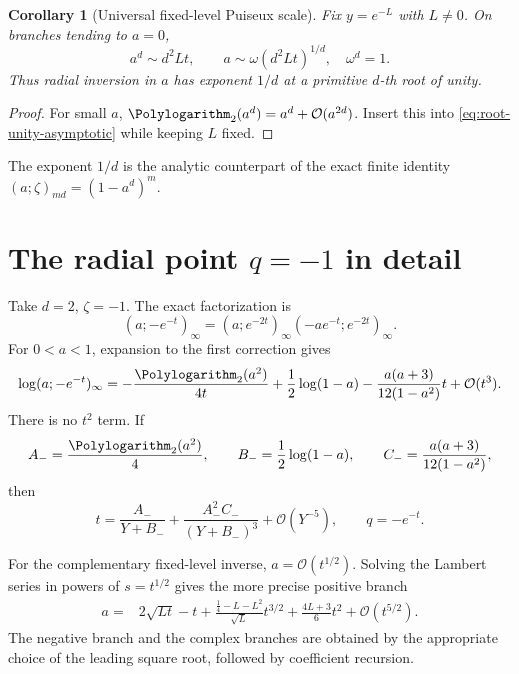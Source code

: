 \documentclass[11pt,oneside]{book}
\newtheorem{corollary}[theorem]{Corollary}
\theoremstyle{definition}
\theoremstyle{remark}
\newcommand{\OO}{\mathcal{O}}
\begin{document}
\begin{corollary}[Universal fixed-level Puiseux scale]\label{cor:a-root-unity-scale}
Fix $y=e^{-L}$ with $L\ne0$.  On branches tending to $a=0$,
\begin{equation}\label{eq:a-root-unity-leading}
 a^d\sim d^2Lt,
 \qquad
 a\sim\omega(d^2Lt)^{1/d},\quad \omega^d=1.
\end{equation}
Thus radial inversion in $a$ has exponent $1/d$ at a primitive $d$-th root of
unity.
\end{corollary}
\begin{proof}
For small $a$, $\Polylogarithm_2(a^d)=a^d+\OO(a^{2d})$.  Insert this into
\eqref{eq:root-unity-asymptotic} while keeping $L$ fixed.
\end{proof}

The exponent $1/d$ is the analytic counterpart of the exact finite identity
$(a;\zeta)_{md}=(1-a^d)^m$.

\section{The radial point $q=-1$ in detail}
Take $d=2$, $\zeta=-1$.  The exact factorization is
\[
 (a;-e^{-t})_\infty
 =(a;e^{-2t})_\infty(-ae^{-t};e^{-2t})_\infty.
\]
For $0<a<1$, expansion to the first correction gives
\begin{equation}\label{eq:minus-one-infinite-fixed-a}
 \log(a;-e^{-t})_\infty
 =-\frac{\Polylogarithm_2(a^2)}{4t}+\frac12\log(1-a)
 -\frac{a(a+3)}{12(1-a^2)}t+\OO(t^3).
\end{equation}
There is no $t^2$ term.  If
\[
 A_-={\Polylogarithm_2(a^2)\over4},\qquad
 B_-={1\over2}\log(1-a),\qquad
 C_-={a(a+3)\over12(1-a^2)},
\]
then
\begin{equation}\label{eq:minus-one-inverse-t}
 t=\frac{A_-}{Y+B_-}
 +\frac{A_-^2C_-}{(Y+B_-)^3}+\OO(Y^{-5}),
 \qquad q=-e^{-t}.
\end{equation}

For the complementary fixed-level inverse, $a=\OO(t^{1/2})$.  Solving the
Lambert series in powers of $s=t^{1/2}$ gives the more precise positive branch
\begin{align}
 a={}&2\sqrt{Lt}-t
 +\frac{\tfrac14-L-L^2}{\sqrt L}t^{3/2}
 +\frac{4L+3}{6}t^2+\OO(t^{5/2}).
 \label{eq:a-fixed-level-minus-one}
\end{align}
The negative branch and the complex branches are obtained by the appropriate
choice of the leading square root, followed by coefficient recursion.
\end{document}
